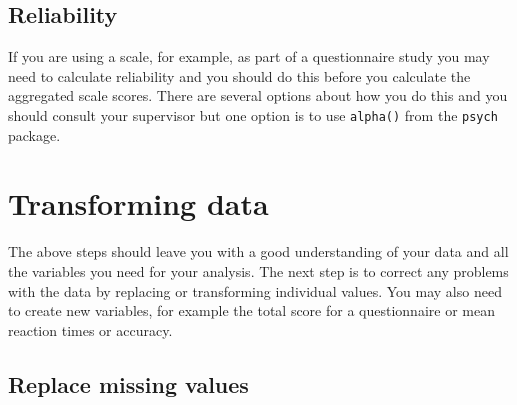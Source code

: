 \documentclass[]{book}
\newenvironment{Shaded}{\begin{snugshade}}{\end{snugshade}}
\newcommand{\CommentTok}[1]{\textcolor[rgb]{0.56,0.35,0.01}{\textit{#1}}}
\newcommand{\DataTypeTok}[1]{\textcolor[rgb]{0.13,0.29,0.53}{#1}}
\newcommand{\DecValTok}[1]{\textcolor[rgb]{0.00,0.00,0.81}{#1}}
\newcommand{\KeywordTok}[1]{\textcolor[rgb]{0.13,0.29,0.53}{\textbf{#1}}}
\newcommand{\NormalTok}[1]{#1}
\newcommand{\OperatorTok}[1]{\textcolor[rgb]{0.81,0.36,0.00}{\textbf{#1}}}
\newcommand{\OtherTok}[1]{\textcolor[rgb]{0.56,0.35,0.01}{#1}}
\newcommand{\StringTok}[1]{\textcolor[rgb]{0.31,0.60,0.02}{#1}}
\begin{document}
\hypertarget{reliability}{%
\subsection{Reliability}\label{reliability}}

If you are using a scale, for example, as part of a questionnaire study you may need to calculate reliability and you should do this before you calculate the aggregated scale scores. There are several options about how you do this and you should consult your supervisor but one option is to use \texttt{alpha()} from the \texttt{psych} package.

\begin{Shaded}
\end{Shaded}

\hypertarget{transforming-data}{%
\section{Transforming data}\label{transforming-data}}

The above steps should leave you with a good understanding of your data and all the variables you need for your analysis. The next step is to correct any problems with the data by replacing or transforming individual values. You may also need to create new variables, for example the total score for a questionnaire or mean reaction times or accuracy.

\hypertarget{replace-missing-values}{%
\subsection{Replace missing values}\label{replace-missing-values}}

\begin{Shaded}
\end{Shaded}
\end{document}
